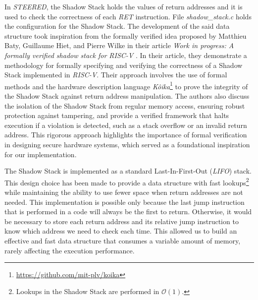 In \textit{STEERED}, the Shadow Stack holds the values of return addresses and
it is used to check the correctness of each \textit{RET} instruction. File
\textit{shadow\_stack.c} holds the configuration for the Shadow Stack. The
development of the said data structure took inspiration from the formally
verified idea proposed by Matthieu Baty, Guillaume Hiet, and Pierre Wilke in
their article \textit{Work in progress: A formally verified shadow stack for RISC-V}
\cite{shadowstack}. In their article, they demonstrate a methodology for formally
specifying and verifying the correctness of a Shadow Stack implemented in \textit{RISC-V}.
Their approach involves the use of formal methods and the hardware description language
\textit{Kôika}\footnote{\url{https://github.com/mit-plv/koika}} to prove the integrity
of the Shadow Stack against return address manipulation. The authors also
discuss the isolation of the Shadow Stack from regular memory access, ensuring robust
protection against tampering, and provide a verified framework that halts
execution if a violation is detected, such as a stack overflow or an invalid return
address. This rigorous approach highlights the importance of formal verification
in designing secure hardware systems, which served as a foundational inspiration
for our implementation.

The Shadow Stack is implemented as a standard Last-In-First-Out (\textit{LIFO})
stack. This design choice has been made to provide a data structure with fast lookups\footnote{Lookups
in the Shadow Stack are performed in $\mathcal{O}(1)$.} while maintaining the
ability to use fewer space when return addresses are not needed. This implementation
is possible only because the last jump instruction that is performed in a code will
always be the first to return. Otherwise, it would be necessary to store each return
address and its relative jump instruction to know which address we need to check
each time. This allowed us to build an effective and fast data structure that
consumes a variable amount of memory, rarely affecting the execution performance.


